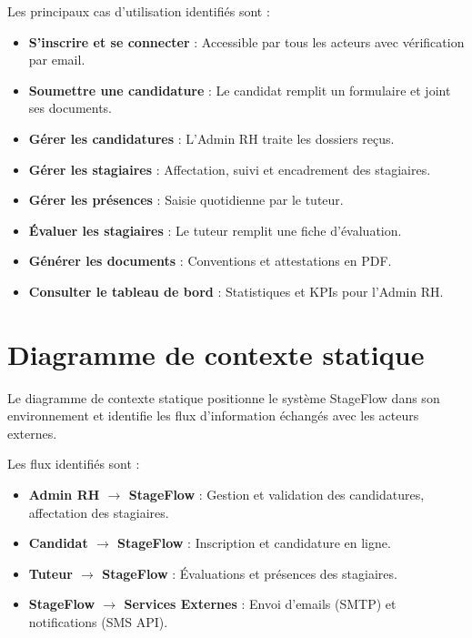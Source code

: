 
Les principaux cas d'utilisation identifiés sont :
\begin{itemize}
    \item \textbf{S'inscrire et se connecter} : Accessible par tous les acteurs avec vérification par email.
    \item \textbf{Soumettre une candidature} : Le candidat remplit un formulaire et joint ses documents.
    \item \textbf{Gérer les candidatures} : L'Admin RH traite les dossiers reçus.
    \item \textbf{Gérer les stagiaires} : Affectation, suivi et encadrement des stagiaires.
    \item \textbf{Gérer les présences} : Saisie quotidienne par le tuteur.
    \item \textbf{Évaluer les stagiaires} : Le tuteur remplit une fiche d'évaluation.
    \item \textbf{Générer les documents} : Conventions et attestations en PDF.
    \item \textbf{Consulter le tableau de bord} : Statistiques et KPIs pour l'Admin RH.
\end{itemize}

\section{Diagramme de contexte statique}
Le diagramme de contexte statique positionne le système StageFlow dans son environnement et identifie les flux d'information échangés avec les acteurs externes.


Les flux identifiés sont :
\begin{itemize}
    \item \textbf{Admin RH $\rightarrow$ StageFlow} : Gestion et validation des candidatures, affectation des stagiaires.
    \item \textbf{Candidat $\rightarrow$ StageFlow} : Inscription et candidature en ligne.
    \item \textbf{Tuteur $\rightarrow$ StageFlow} : Évaluations et présences des stagiaires.
    \item \textbf{StageFlow $\rightarrow$ Services Externes} : Envoi d'emails (SMTP) et notifications (SMS API).
\end{itemize}


